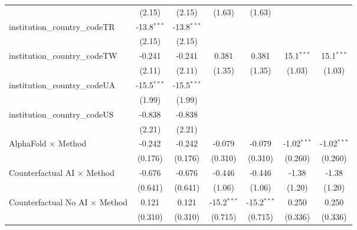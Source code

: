 \begin{tabular}{lcccccc}
                                         & (2.15)        & (2.15)        & (1.63)        & (1.63)        &               &   \\   
   institution\_country\_codeTR          & -13.8$^{***}$ & -13.8$^{***}$ &               &               &               &   \\   
                                         & (2.15)        & (2.15)        &               &               &               &   \\   
   institution\_country\_codeTW          & -0.241        & -0.241        & 0.381         & 0.381         & 15.1$^{***}$  & 15.1$^{***}$\\   
                                         & (2.11)        & (2.11)        & (1.35)        & (1.35)        & (1.03)        & (1.03)\\   
   institution\_country\_codeUA          & -15.5$^{***}$ & -15.5$^{***}$ &               &               &               &   \\   
                                         & (1.99)        & (1.99)        &               &               &               &   \\   
   institution\_country\_codeUS          & -0.838        & -0.838        &               &               &               &   \\   
                                         & (2.21)        & (2.21)        &               &               &               &   \\   
   AlphaFold $\times$ Method             & -0.242        & -0.242        & -0.079        & -0.079        & -1.02$^{***}$ & -1.02$^{***}$\\   
                                         & (0.176)       & (0.176)       & (0.310)       & (0.310)       & (0.260)       & (0.260)\\   
   Counterfactual AI $\times$ Method     & -0.676        & -0.676        & -0.446        & -0.446        & -1.38         & -1.38\\   
                                         & (0.641)       & (0.641)       & (1.06)        & (1.06)        & (1.20)        & (1.20)\\   
   Counterfactual No AI $\times$ Method  & 0.121         & 0.121         & -15.2$^{***}$ & -15.2$^{***}$ & 0.250         & 0.250\\   
                                         & (0.310)       & (0.310)       & (0.715)       & (0.715)       & (0.336)       & (0.336)\\   

\end{tabular}
